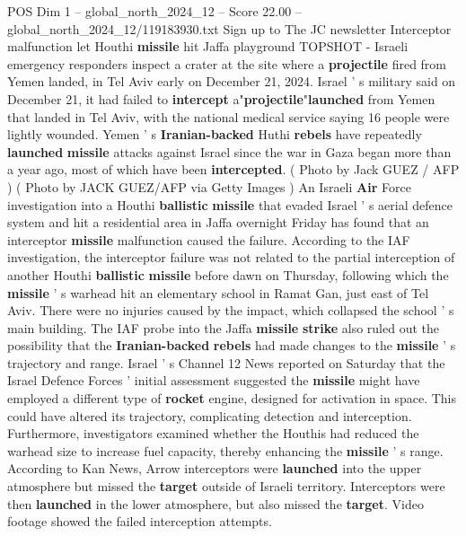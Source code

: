\begin{textsample}{POS Dim 1 – global\_north\_2024\_12 – Score 22.00 – global\_north\_2024\_12/119183930.txt}  \label{ex:f1_pos_263}
Sign up to The JC newsletter Interceptor malfunction let Houthi \textbf{missile} hit Jaffa playground TOPSHOT - Israeli emergency responders inspect a crater at the site where a \textbf{projectile} fired from Yemen landed, in Tel Aviv early on December 21, 2024.
Israel ' s military said on December 21, it had failed to \textbf{intercept} a"\textbf{projectile}"\textbf{launched} from Yemen that landed in Tel Aviv, with the national medical service saying 16 people were lightly wounded.
Yemen ' s \textbf{Iranian-backed} Huthi \textbf{rebels} have repeatedly \textbf{launched} \textbf{missile} attacks against Israel since the war in Gaza began more than a year ago, most of which have been \textbf{intercepted}. ( Photo by Jack GUEZ / AFP ) ( Photo by JACK GUEZ/AFP via Getty Images ) An Israeli \textbf{Air} Force investigation into a Houthi \textbf{ballistic} \textbf{missile} that evaded Israel ' s aerial defence system and hit a residential area in Jaffa overnight Friday has found that an interceptor \textbf{missile} malfunction caused the failure.
According to the IAF investigation, the interceptor failure was not related to the partial interception of another Houthi \textbf{ballistic} \textbf{missile} before dawn on Thursday, following which the \textbf{missile} ' s warhead hit an elementary school in Ramat Gan, just east of Tel Aviv.
There were no injuries caused by the impact, which collapsed the school ' s main building.
The IAF probe into the Jaffa \textbf{missile} \textbf{strike} also ruled out the possibility that the \textbf{Iranian-backed} \textbf{rebels} had made changes to the \textbf{missile} ' s trajectory and range.
Israel ' s Channel 12 News reported on Saturday that the Israel Defence Forces ' initial assessment suggested the \textbf{missile} might have employed a different type of \textbf{rocket} engine, designed for activation in space.
This could have altered its trajectory, complicating detection and interception.
Furthermore, investigators examined whether the Houthis had reduced the warhead size to increase fuel capacity, thereby enhancing the \textbf{missile} ' s range.
According to Kan News, Arrow interceptors were \textbf{launched} into the upper atmosphere but missed the \textbf{target} outside of Israeli territory.
Interceptors were then \textbf{launched} in the lower atmosphere, but also missed the \textbf{target}.
Video footage showed the failed interception attempts.

\end{textsample}
